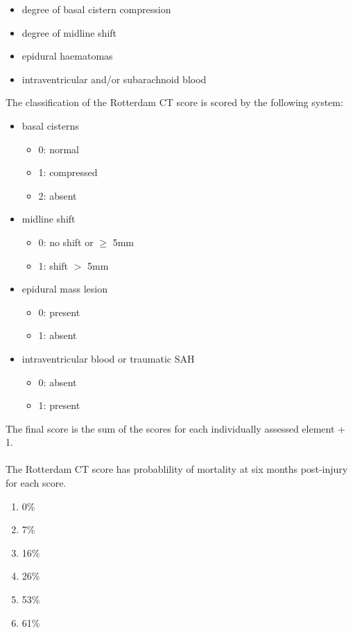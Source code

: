 \documentclass[11pt]{article}
\begin{document}
\begin{itemize}
\item{degree of basal cistern compression}
\item{degree of midline shift}
\item{epidural haematomas}
\item{intraventricular and/or subarachnoid blood}
\end{itemize}

The classification of the Rotterdam CT score is scored by the following system:

\begin{itemize}
\item{basal cisterns}
  \begin{itemize}
    \item{0: normal}
    \item{1: compressed}
    \item{2: absent}
  \end{itemize}
\item{midline shift}
  \begin{itemize}
    \item{0: no shift or $\geq$ 5mm}
    \item{1: shift $>$ 5mm}
  \end{itemize}
\item{epidural mass lesion}
  \begin{itemize}
    \item{0: present}
    \item{1: absent}
  \end{itemize}
\item{intraventricular blood or traumatic SAH}
  \begin{itemize}
    \item{0: absent}
    \item{1: present}
  \end{itemize}
\end{itemize}
The final score is the sum of the scores for each individually assessed element + 1.\\
\\
The Rotterdam CT score has probablility of mortality at six months post-injury for each score.\\
\begin{enumerate}
  \item{0\%}
  \item{7\%}
  \item{16\%}
  \item{26\%}
  \item{53\%}
  \item{61\%}
\end{enumerate}
\end{document}
